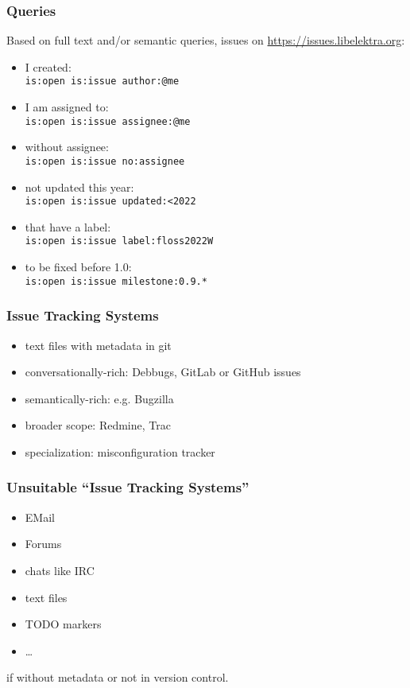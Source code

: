 \begin{frame}[fragile]
	\frametitle{Queries}
	Based on full text and/or semantic queries, issues on \url{https://issues.libelektra.org}:

	\begin{itemize}
		\item I created: \\
			\verb+is:open is:issue author:@me+
		\item I am assigned to: \\
			\verb+is:open is:issue assignee:@me+
		\item without assignee: \\
			\verb+is:open is:issue no:assignee+
		\item not updated this year: \\
			\verb+is:open is:issue updated:<2022+
		\item that have a label: \\
			\verb+is:open is:issue label:floss2022W+
		\item to be fixed before 1.0: \\
			\verb+is:open is:issue milestone:0.9.*+
	\end{itemize}
\end{frame}

\begin{frame}
	\frametitle{Issue Tracking Systems}

	\begin{itemize}
		\item text files with metadata in git
		\item conversationally-rich: Debbugs, GitLab or GitHub issues
		\item semantically-rich: e.g. Bugzilla
		\item broader scope: Redmine, Trac
		\item specialization: misconfiguration tracker
	\end{itemize}
\end{frame}

\begin{frame}
	\frametitle{Unsuitable ``Issue Tracking Systems''}

	\begin{itemize}
		\item EMail
		\item Forums
		\item chats like IRC
		\item text files
		\item TODO markers
		\item \dots
	\end{itemize}

	if without metadata or not in version control.
\end{frame}

